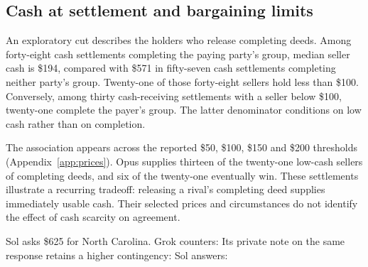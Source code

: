 \subsection{Cash at settlement and bargaining limits}

An exploratory cut describes the holders who release completing deeds. Among forty-eight cash settlements completing the paying party's group, median seller cash is \$194, compared with \$571 in fifty-seven cash settlements completing neither party's group. Twenty-one of those forty-eight sellers hold less than \$100. Conversely, among thirty cash-receiving settlements with a seller below \$100, twenty-one complete the payer's group. The latter denominator conditions on low cash rather than on completion.

The association appears across the reported \$50, \$100, \$150 and \$200 thresholds (Appendix~\ref{app:prices}). Opus supplies thirteen of the twenty-one low-cash sellers of completing deeds, and six of the twenty-one eventually win. These settlements illustrate a recurring tradeoff: releasing a rival's completing deed supplies immediately usable cash. Their selected prices and circumstances do not identify the effect of cash scarcity on agreement.


Sol asks \$625 for North Carolina. Grok counters:
Its private note on the same response retains a higher contingency:
Sol answers:

